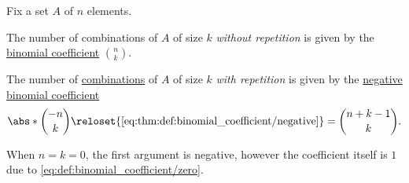 \begin{proposition}\label{thm:combinatorial_combination_count}
  Fix a set \( A \) of \( n \) elements.

  \begin{thmenum}
     The number of combinations of \( A \) of size \( k \) \emph{without repetition} is given by the \hyperref[def:binomial_coefficient]{binomial coefficient} \( \binom n k \).

     The number of \hyperref[def:combinatorial_combination]{combinations} of \( A \) of size \( k \) \emph{with repetition} is given by the \hyperref[def:binomial_coefficient]{negative binomial coefficient}
    \begin{equation}\label{eq:thm:combinatorial_combination_count/repetition}
      \abs*{ \binom {-n} k }
      \reloset {\eqref{eq:thm:def:binomial_coefficient/negative}} =
      \binom {n + k - 1} k.
    \end{equation}

    When \( n = k = 0 \), the first argument is negative, however the coefficient itself is \( 1 \) due to \eqref{eq:def:binomial_coefficient/zero}.
  \end{thmenum}
\end{proposition}
